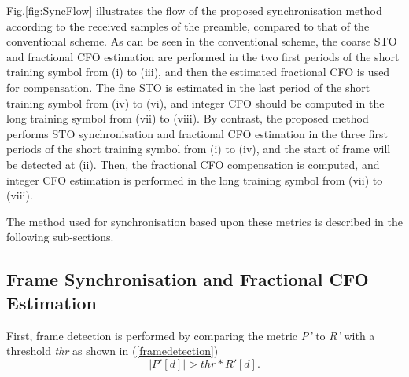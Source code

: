 Fig.\ref{fig:SyncFlow} illustrates the flow of the proposed synchronisation method according to the received samples of the preamble, compared to that of the conventional scheme.
As can be seen in the conventional scheme, the coarse STO and fractional CFO estimation are performed in the two first periods of the short training symbol from (i) to (iii), and then the estimated fractional CFO is used for compensation.
The fine STO is estimated in the last period of the short training symbol from (iv) to (vi), and integer CFO should be computed in the long training symbol from (vii) to (viii).
By contrast, the proposed method performs STO synchronisation and fractional CFO estimation in the three first periods of the short training symbol from (i) to (iv), and the start of frame will be detected at (ii).
Then, the fractional CFO compensation is computed, and integer CFO estimation is performed in the long training symbol from (vii) to (viii).

The method used for synchronisation based upon these metrics is described in the following sub-sections.

\subsection{Frame Synchronisation and Fractional CFO Estimation}

First, frame detection is performed by comparing the metric \emph{P'} to \emph{R'} with a threshold \emph{thr} as shown in (\ref{framedetection})
\begin{equation}
\label{framedetection}
|P'[d]| > thr * R'[d].
\end{equation}

